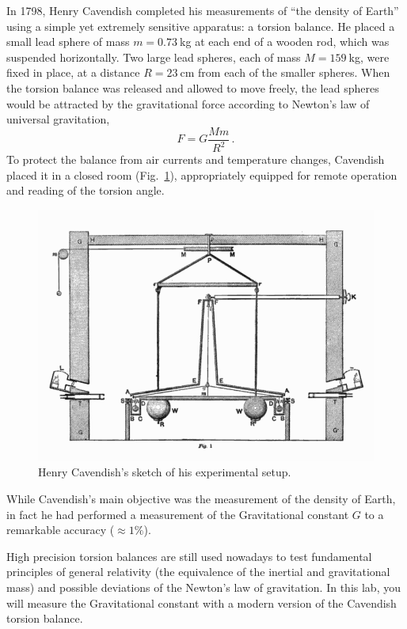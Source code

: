 In 1798, Henry Cavendish completed his measurements of ``the density of Earth'' using a
simple yet extremely sensitive apparatus: a torsion balance. He placed a small lead sphere
of mass $m = 0.73\:$kg at each end of a wooden rod, which was suspended horizontally.
Two large lead spheres, each of mass $M = 159\:$kg, were fixed in place, at a distance $R =
23\:$cm from each of the smaller spheres. When the torsion balance was released and
allowed to move freely, the lead spheres would be attracted by the gravitational force according to Newton's law of universal gravitation,
\begin{equation}\label{cav:eq:newtons-grav}
 F = G \frac{M m}{R^2} \,.
\end{equation}
To protect the balance from air currents and temperature changes, Cavendish placed it in
a closed room (Fig.~\ref{cav:fig:original-setup}), appropriately equipped for remote operation and reading of the
torsion angle.

\begin{figure}
	\centering
	\includegraphics[width=\textwidth]{cavendish/Cavendish_Experiment}
	\caption{Henry Cavendish's sketch of his experimental setup.}\label{cav:fig:original-setup}
\end{figure}

While Cavendish's main objective was the measurement of the density of Earth, in fact
he had performed a measurement of the Gravitational constant $G$ to a remarkable
accuracy ($\approx 1\%$).

High precision torsion balances are still used nowadays to test fundamental principles of
general relativity (the equivalence of the inertial and gravitational mass) and possible
deviations of the Newton’s law of gravitation. In this lab, you will measure the
Gravitational constant with a modern version of the Cavendish torsion balance.

